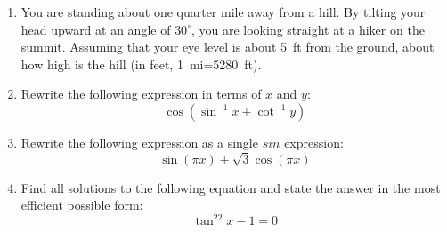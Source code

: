 \documentclass[letterpaper,12pt,fleqn]{article}
\begin{document}
\begin{enumerate}[left=0pt]
  \begin{center}
  \end{center}

  \newpage

\item You are standing about one quarter mile away from a hill.  By tilting your head upward at an angle of
  \(30^{\circ}\), you are looking straight at a hiker on the summit.  Assuming that your eye level is about
  \SI{5}{ft} from the ground, about how high is the hill (in feet, \SI{1}{mi}=\SI{5280}{ft}).

  \vspace{3in}

\item Rewrite the following expression in terms of \(x\) and \(y\):
  \[\cos(\sin^{-1}x+\cot^{-1}y)\]

  \newpage

\item Rewrite the following expression as a single \(sin\) expression:
  \[\sin(\pi x)+\sqrt{3}\cos(\pi x)\]

  \vspace{4in}

\item Find all solutions to the following equation and state the answer in the most efficient possible form:
  \[\tan^22x-1=0\]
\end{enumerate}
\end{document}
